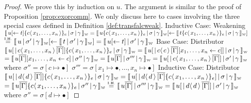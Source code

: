 \documentclass[a4paper,UKenglish,cleveref, autoref]{lipics-v2019}
\newcommand{\share}[3]{#1 [#2 \leftarrow #3]}
\newcommand{\dist}[5]{#1 [ #2 \, \vert \, \fakedist{#4}{#5} \, #3 ]}
\newcommand{\fakedist}[2]{#1 \langle \, #2 \, \rangle}
\newcommand{\exor}[3]{#1 \{ \fakedist{#2}{#3} \}_{e}}
\newcommand{\weaksymbol}{\mbox{\tiny $\mathcal{W}$}}
\newcommand{\readweakwmap}[3]{\llbracket \, #1 \, \vert \, #2 \, \vert \, #3  \, \rrbracket_{\weaksymbol} }
\newcommand{\IH}{\stackrel{\hbox{\tiny I.H.}}{\hbox{=}}}
\begin{document}
\begin{proof}
We prove this by induction on $u$. The argument is similar to the proof of Proposition \ref{prop:exorcomm}. We only discuss here to cases involving the three special cases defined in Definition \ref{def:transfalcweak}.
\newline
\newline
Inductive Case: Weakening
\newline
$\readweakwmap{\share{u}{}{t} \exor{}{c}{x_{1}, \dots, x_{n}}}{\sigma}{\gamma} = \share{\readweakwmap{u \exor{}{c}{x_{1}, \dots, x_{n}}}{\sigma}{\gamma}}{}{\readweakwmap{t \exor{}{c}{x_{1}, \dots, x_{n}}}{\sigma}{\gamma}}$
\newline
$\IH \share{\readweakwmap{u}{\sigma'}{\gamma}}{}{\readweakwmap{t}{\sigma'}{\gamma}} = \readweakwmap{\share{u}{}{t}}{\sigma'}{\gamma}$
\newline
\newline
Base Case: Distributor
\newline
$\readweakwmap{\dist{u}{}{\overline{[\Gamma]}}{c}{x_{1}, \dots, x_{n}} \exor{}{c}{x_{1}, \dots, x_{n}} }{\sigma}{\gamma} = \readweakwmap{\dist{u}{}{\overline{[\Gamma]} \share{}{x_{1}, \dots, x_{n}}{c}}{c}{c}  }{\sigma}{\gamma}$
\newline
$= \readweakwmap{u \overline{[\Gamma]}  \share{}{x_{1}, \dots, x_{n}}{c} }{\sigma''}{\gamma} = \readweakwmap{u \overline{[\Gamma]}}{\sigma'''}{\gamma} = \readweakwmap{\dist{u}{}{\overline{[\Gamma]}}{c}{x_{1}, \dots, x_{n}}}{\sigma'}{\gamma}$
\newline
where
\newline
$\sigma'' = \sigma [c \mapsto \bullet]$
\newline
$\sigma''' = \sigma [x_{1} \mapsto \bullet, \dots, x_{n} \mapsto \bullet]$
\newline
\newline
Inductive Case: Distributor
\newline
$\readweakwmap{\dist{u}{}{\overline{[\Gamma]}}{d}{d} \exor{}{c}{x_{1}, \dots, x_{n}} }{\sigma}{\gamma} = \readweakwmap{\dist{u}{}{\overline{[\Gamma]}  \exor{}{c}{x_{1}, \dots, x_{n}} }{d}{d} }{\sigma}{\gamma}$
\newline
$= \readweakwmap{u \overline{[\Gamma]}  \exor{}{c}{x_{1}, \dots, x_{n}} }{\sigma''}{\gamma} \IH \readweakwmap{u \overline{[\Gamma]} }{\sigma'''}{\gamma} = \readweakwmap{\dist{u}{}{\overline{[\Gamma]}}{d}{d} }{\sigma'}{\gamma} $
\newline
where
\newline
$\sigma'' = \sigma [d \mapsto \bullet]$

\end{proof}
\end{document}
